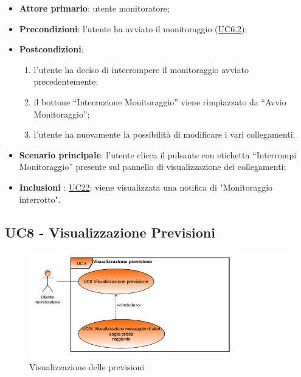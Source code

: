 		\begin{itemize}
			\item\textbf{Attore primario}: utente monitoratore;
			\item\textbf{Precondizioni}: l’utente ha avviato il monitoraggio (\hyperref[par:UC6.2]{UC6.2});
			\item\textbf{Postcondizioni}:
				\begin{enumerate}
					\item l’utente ha deciso di interrompere il monitoraggio avviato precedentemente; 
					\item il bottone “Interruzione Monitoraggio” viene rimpiazzato da “Avvio Monitoraggio”;
					\item l’utente ha nuovamente la possibilità di modificare i vari collegamenti. 
				\end{enumerate}	
			\item\textbf{Scenario principale}: l’utente clicca il pulsante con etichetta “Interrompi Monitoraggio” presente sul pannello di visualizzazione dei collegamenti;
			\item\textbf{Inclusioni }: \hyperref[par:UC22]{UC22}: viene visualizzata una notifica di "Monitoraggio interrotto".		
		\end{itemize}


	\label{par:UC8}
	\subsection{UC8 - Visualizzazione Previsioni}

	\begin{figure}[H]
		\centering
		\includegraphics[scale=0.80]{../Analisi_dei_requisiti/img/Diagrammi_UML/UC8_Visualizzazione_previsioni.png}
		\caption{Visualizzazione delle previsioni}
	\end{figure}

